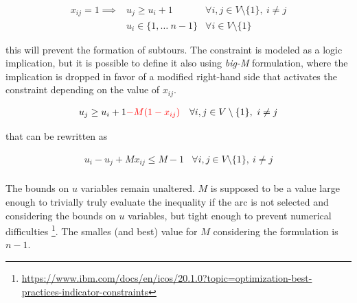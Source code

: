 \begin{equation*} 
    \begin{array}{llr} 
        x_{ij} = 1 \implies & u_j \geq u_i + 1 & \forall i, j \in V \setminus \{1\},\ i \neq j \\
                            & u_i \in \{1, \dots\ n-1\} & \forall i \in V \setminus \{1\}
    \end{array} 
\end{equation*}

this will prevent the formation of subtours. 
The constraint is modeled as a
logic implication, but it is possible to define it also using \emph{big-M}
formulation, where the implication is dropped in favor of a modified right-hand
side that activates the constraint depending on the value of $x_{ij}$.

\begin{equation*} 
    \begin{array}{lr} 
        u_j \geq u_i + 1 \textcolor{red}{ - M (1 - x_{ij})} & \forall i, j \in V \setminus \{1\},\ i \neq j \\
    \end{array} 
\end{equation*}

that can be rewritten as

\begin{equation*} 
    \begin{array}{lr} 
        u_i - u_j + M x_{ij} \leq M - 1 & \forall i, j \in V \setminus \{1\},\ i \neq j \\
    \end{array} 
\end{equation*}

The bounds on $u$ variables remain unaltered. $M$ is supposed to be a
value large enough to trivially truly evaluate the inequality if the arc is not
selected and considering the bounds on $u$ variables, but tight enough to
prevent numerical difficulties
\footnote{\href{https://www.ibm.com/docs/en/icos/20.1.0?topic=optimization-best-practices-indicator-constraints}{https://www.ibm.com/docs/en/icos/20.1.0?topic=optimization-best-practices-indicator-constraints}}.
The smalles (and best) value for $M$ considering the formulation is $n - 1$.

